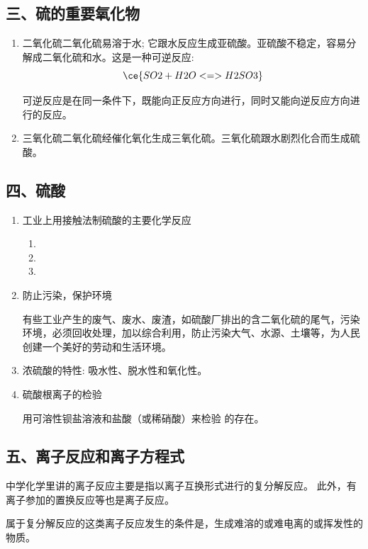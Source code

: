 \subsection*{三、硫的重要氧化物}
\begin{enumerate}[1.]
  \item 二氧化硫\quad 二氧化硫易溶于水; 它跟水反应生成亚硫酸。亚硫酸不稳定，容易分解成二氧化硫和水。这是一种可逆反应:
  \[ \ce{ SO2 + H2O <=> H2SO3 }\]

  可逆反应是在同一条件下，既能向正反应方向进行，同时又能向逆反应方向进行的反应。
  \item 三氧化硫\quad 二氧化硫经催化氧化生成三氧化硫。三氧化硫跟水剧烈化合而生成硫酸。
\end{enumerate}

\subsection*{四、硫酸}
\begin{enumerate}[1.]
  \item 工业上用接触法制硫酸的主要化学反应
  \begin{enumerate}[(1)]
    \item {}
    \item {}
    \item {}
  \end{enumerate}
  \item 防止污染，保护环境
  
  有些工业产生的废气、废水、废渣，如硫酸厂排出的含二氧化硫的尾气，污染环境，必须回收处理，加以综合利用，防止污染大气、水源、土壤等，为人民创建一个美好的劳动和生活环境。
  \item 浓硫酸的特性: 吸水性、脱水性和氧化性。
  \item 硫酸根离子的检验
  
  用可溶性钡盐溶液和盐酸（或稀硝酸）来检验  的存在。
\end{enumerate}

\subsection*{五、离子反应和离子方程式}
中学化学里讲的离子反应主要是指以离子互换形式进行的复分解反应。
此外，有离子参加的置换反应等也是离子反应。

属于复分解反应的这类离子反应发生的条件是，生成难溶的或难电离的或挥发性的物质。


